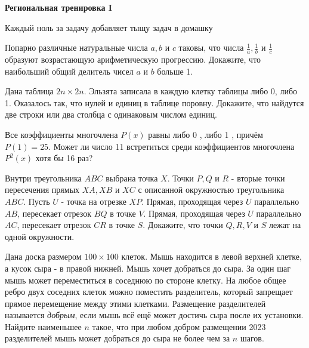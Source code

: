 \centerline{\bf \Huge Региональная тренировка I}

\begin{flushright}
        \scriptsize{Каждый ноль за задачу добавляет тыщу задач в домашку}
\end{flushright}

Попарно различные натуральные числа $a, b$ и $c$ таковы, что числа $\frac{1}{a}, \frac{1}{b}$ и $\frac{1}{c}$ образуют возрастающую арифметическую прогрессию. Докажите, что наибольший общий делитель чисел $a$ и $b$ больше 1.

Дана таблица $2n\times2n$. Эльзята записала в каждую клетку таблицы либо 0, либо 1. Оказалось так, что нулей и единиц в таблице поровну. Докажите, что найдутся две строки или два столбца с одинаковым числом единиц.

Все коэффициенты многочлена $P(x)$ равны либо 0 , либо 1 , причём $P(1)=25$. Может ли число 11 встретиться среди коэффициентов многочлена $P^2(x)$ хотя бы 16 раз?

Внутри треугольника $A B C$ выбрана точка $X$. Точки $P, Q$ и $R$ - вторые точки пересечения прямых $X A, X B$ и $X C$ с описанной окружностью треугольника $A B C$. Пусть $U$ - точка на отрезке $X P$. Прямая, проходящая через $U$ параллельно $A B$, пересекает отрезок $B Q$ в точке $V$. Прямая, проходящая через $U$ параллельно $A C$, пересекает отрезок $C R$ в точке $S$. Докажите, что точки $Q, R, V$ и $S$ лежат на одной окружности.

Дана доска размером $100 \times 100$ клеток. Мышь находится в левой верхней клетке, а кусок сыра - в правой нижней. Мышь хочет добраться до сыра. За один шаг мышь может переместиться в соседнюю по стороне клетку. На любое общее ребро двух соседних клеток можно поместить разделитель, который запрещает прямое перемещение между этими клетками. Размещение разделителей называется \textit{добрым}, если мышь всё ещё может достичь сыра после их установки. Найдите наименьшее $n$ такое, что при любом добром размещении 2023 разделителей мышь может добраться до сыра не более чем за $n$ шагов.